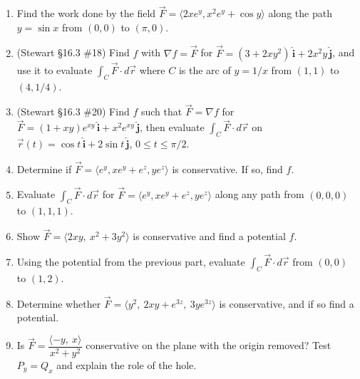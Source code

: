 \documentclass[12pt]{article}
\newcommand{\ihat}{\hat{\textbf{i}}}
\newcommand{\jhat}{\hat{\textbf{j}}}
\begin{document}
\begin{enumerate}
\begin{enumerate}
        \item Find the work done by the field $\vec{F} = \langle 2xe^y, x^2e^y + \cos y \rangle$ along the path $y = \sin x$ from $(0,0)$ to $(\pi, 0)$.
        \item (Stewart \S16.3 \#18) Find $f$ with $\nabla f = \vec F$ for $\vec F = (3 + 2xy^2)\,\ihat + 2x^2 y\,\jhat$, and use it to evaluate $\int_C \vec F\cdot d\vec r$ where $C$ is the arc of $y = 1/x$ from $(1,1)$ to $(4, 1/4)$.
        \item (Stewart \S16.3 \#20) Find $f$ such that $\vec F = \nabla f$ for $\vec F = (1+xy)e^{xy}\,\ihat + x^2 e^{xy}\,\jhat$, then evaluate $\int_C \vec F\cdot d\vec r$ on $\vec r(t) = \cos t\,\ihat + 2\sin t\,\jhat$, $0\leq t\leq \pi/2$.
        \item Determine if $\vec{F} = \langle e^y, xe^y + e^z, ye^z \rangle$ is conservative. If so, find $f$.
        \item Evaluate $\int_C \vec{F} \cdot d\vec{r}$ for $\vec{F} = \langle e^y, xe^y + e^z, ye^z \rangle$ along any path from $(0,0,0)$ to $(1,1,1)$.
        \item Show $\vec F=\langle 2xy,\ x^2+3y^2\rangle$ is conservative and find a potential $f$.
        \item Using the potential from the previous part, evaluate $\int_C \vec F\cdot d\vec r$ from $(0,0)$ to $(1,2)$.
        \item Determine whether $\vec F=\langle y^2,\ 2xy+e^{3z},\ 3y e^{3z}\rangle$ is conservative, and if so find a potential.
        \item Is $\vec F=\dfrac{\langle -y,\ x\rangle}{x^2+y^2}$ conservative on the plane with the origin removed? Test $P_y=Q_x$ and explain the role of the hole.
    \end{enumerate}
\newpage


\end{enumerate}
\end{document}

